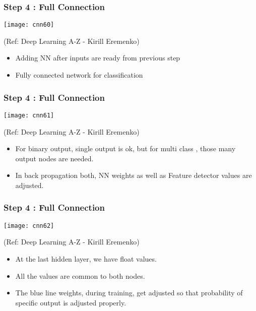 \begin{frame}[fragile] \frametitle{Step 4 : Full Connection}

\begin{center}
\texttt{[image: cnn60]}

\tiny{(Ref: Deep Learning A-Z - Kirill Eremenko)}
\end{center}

\begin{itemize}
\item Adding NN after inputs are ready from previous step
\item Fully connected network for classification
\end{itemize}

\end{frame}

\begin{frame}[fragile] \frametitle{Step 4 : Full Connection}

\begin{center}
\texttt{[image: cnn61]}

\tiny{(Ref: Deep Learning A-Z - Kirill Eremenko)}
\end{center}

\begin{itemize}
\item For binary output, single output is ok, but for multi class , those many output nodes are needed.
\item In back propagation both, NN weights as well as Feature detector values are adjusted.

\end{itemize}

\end{frame}

\begin{frame}[fragile] \frametitle{Step 4 : Full Connection}

\begin{center}
\texttt{[image: cnn62]}

\tiny{(Ref: Deep Learning A-Z - Kirill Eremenko)}
\end{center}

\begin{itemize}
\item At the last hidden layer, we have float values.
\item All the values are common to both nodes.
\item The blue line weights, during training, get adjusted so that probability of specific output is adjusted properly.

\end{itemize}

\end{frame}

